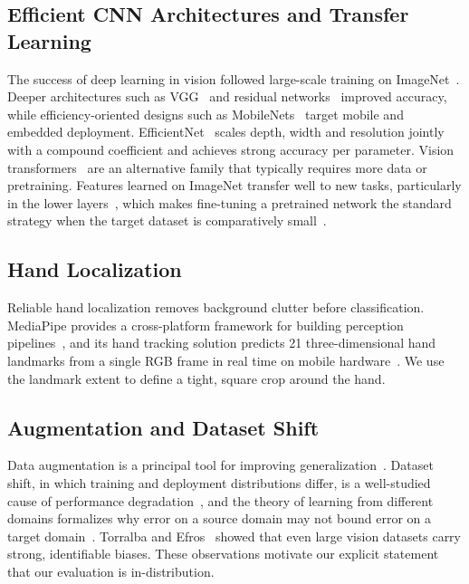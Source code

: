 \documentclass[conference]{IEEEtran}
\begin{document}
\subsection{Efficient CNN Architectures and Transfer Learning}
The success of deep learning in vision followed large-scale training on ImageNet~\cite{deng2009imagenet,krizhevsky2012imagenet}. Deeper architectures such as VGG~\cite{simonyan2015very} and residual networks~\cite{he2016deep} improved accuracy, while efficiency-oriented designs such as MobileNets~\cite{howard2017mobilenets,sandler2018mobilenetv2} target mobile and embedded deployment. EfficientNet~\cite{tan2019efficientnet} scales depth, width and resolution jointly with a compound coefficient and achieves strong accuracy per parameter. Vision transformers~\cite{dosovitskiy2021image} are an alternative family that typically requires more data or pretraining. Features learned on ImageNet transfer well to new tasks, particularly in the lower layers~\cite{yosinski2014transferable}, which makes fine-tuning a pretrained network the standard strategy when the target dataset is comparatively small~\cite{pan2010survey}.

\subsection{Hand Localization}
Reliable hand localization removes background clutter before classification. MediaPipe provides a cross-platform framework for building perception pipelines~\cite{lugaresi2019mediapipe}, and its hand tracking solution predicts 21 three-dimensional hand landmarks from a single RGB frame in real time on mobile hardware~\cite{zhang2020mediapipe}. We use the landmark extent to define a tight, square crop around the hand.

\subsection{Augmentation and Dataset Shift}
Data augmentation is a principal tool for improving generalization~\cite{shorten2019survey}. Dataset shift, in which training and deployment distributions differ, is a well-studied cause of performance degradation~\cite{quinonero2009dataset}, and the theory of learning from different domains formalizes why error on a source domain may not bound error on a target domain~\cite{bendavid2010theory}. Torralba and Efros~\cite{torralba2011unbiased} showed that even large vision datasets carry strong, identifiable biases. These observations motivate our explicit statement that our evaluation is in-distribution.
\end{document}
